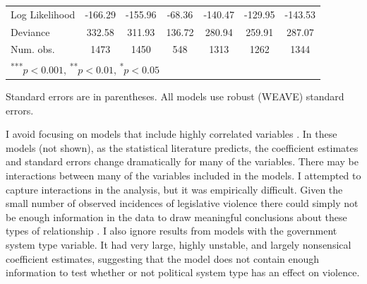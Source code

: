 \documentclass[a4paper]{article}\usepackage[]{graphicx}\usepackage[]{color}
\begin{document}
\begin{table}
\begin{center}
\begin{tabular}{l c c c c c c }
Log Likelihood          & -166.29       & -155.96       & -68.36       & -140.47       & -129.95      & -143.53      \\
Deviance                & 332.58        & 311.93        & 136.72       & 280.94        & 259.91       & 287.07       \\
Num. obs.               & 1473          & 1450          & 548          & 1313          & 1262         & 1344         \\
\hline
\multicolumn{7}{l}{\scriptsize{\textsuperscript{***}$p<0.001$, 
  \textsuperscript{**}$p<0.01$, 
  \textsuperscript{*}$p<0.05$}}
\end{tabular}


\end{center}
{\scriptsize{
    Standard errors are in parentheses. All models use robust (WEAVE) standard errors. \\
}}
\end{table}

I avoid focusing on models that include highly correlated variables \citep[see][]{Achen2002, Schrodt2006}. In these models (not shown), as the statistical literature predicts, the coefficient estimates and standard errors change dramatically for many of the variables. There may be interactions between many of the variables included in the models. I attempted to capture interactions in the analysis, but it was empirically difficult. Given the small number of observed incidences of legislative violence there could simply not be enough information in the data to draw meaningful conclusions about these types of relationship \citep[see][]{Brambor2006}. I also ignore results from models with the government system type variable. It had very large, highly unstable, and largely nonsensical coefficient estimates, suggesting that the model does not contain enough information to test \citep{Babyak2004} whether or not political system type has an effect on violence.
\end{document}
